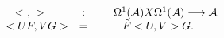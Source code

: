 \begin{equation}\label{METRIC}
\begin{array}{ccc}
 <~,~>~~~~ & : & ~~~~\Omega^1 ({\cal A}) X \Omega^1({\cal A})
 \longrightarrow {\cal A} \\
 < U F, V G > & = & {\tilde F} < U, V> G.
\end{array}
\end{equation}

